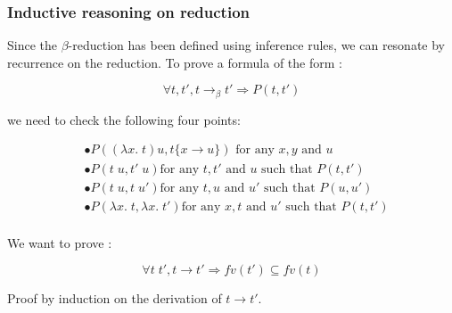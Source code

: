   \subsubsection{Inductive reasoning on reduction}

    Since the $\beta$-reduction has been defined using inference rules, we can
    resonate by recurrence on the reduction. To prove a formula of the form :

    \[
      \forall t, t', t \to_\beta t' \Rightarrow P(t, t')
    \]

    we need to check the following four points:

    \begin{align*}
      &\bullet P((\lambda x.\;t)u, t\{x\rightarrow u\}) \text{ for any } x, y \text{ and
      } u \\
      &\bullet P(t\;u, t'\;u) \text{for any } t, t' \text{ and } u \text{ such that }
      P(t, t') \\
      &\bullet P(t\;u, t\;u') \text{for any } t, u \text{ and } u' \text{ such that }
      P(u, u') \\
      &\bullet P(\lambda x.\;t, \lambda x.\;t') \text{for any } x, t \text{ and } u' \text{ such that }
      P(t, t') \\
    \end{align*}

  \exam We want to prove :

    \[\forall t\;t', t \to t' \Rightarrow fv(t') \subseteq fv(t)\]

  Proof by induction on the derivation of $t \to t'$.

